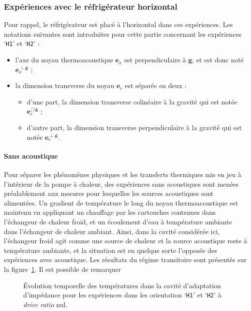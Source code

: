 \subsubsection{Expériences avec le réfrigérateur horizontal}
Pour rappel, le réfrigérateur est placé à l'horizontal dans ces expériences. Les notations suivantes sont introduites pour cette partie concernant les expériences `\texttt{H1}' et `\texttt{H2}' :

\begin{itemize}
\item l'axe du noyau thermoacoustique $\mathbf e_x$ est perpendiculaire à $\mathbf g$, et est donc noté $\mathbf e_x^{\perp \mathbf g}$ ;
\item la dimension transverse du noyau $\mathbf e_r$ est séparée en deux :
	\begin{itemize}
	\item d'une part, la dimension transverse colinéaire à la gravité qui est notée $\mathbf e_r^{// \mathbf g}$ ;
	\item d'autre part, la dimension transverse perpendiculaire à la gravité qui est notée $\mathbf e_r^{\perp \mathbf g}$.
	\end{itemize}
\end{itemize}

\paragraph{Sans acoustique}
Pour séparer les phénomènes physiques et les transferts thermiques mis en jeu à l'intérieur de la pompe à chaleur, des expériences sans acoustiques sont menées préalablement aux mesures pour lesquelles les sources acoustiques sont alimentées. Un gradient de température le long du noyau thermoacoustique est maintenu en appliquant un chauffage par les cartouches contenues dans l'échangeur de chaleur froid, et un écoulement d'eau à température ambiante dans l'échangeur de chaleur ambiant. Ainsi, dans la cavité considérée ici, l'échangeur froid agit comme une source de chaleur et la source acoustique reste à température ambiante, et la situation est en quelque sorte l'opposée des expériences avec acoustique. Les résultats du régime transitoire sont présentés sur la figure~\ref{fig:HeatOnly_CHXout_H1H2}. Il est possible de remarquer

\begin{figure}[!ht]
    \centering
    
    \caption{\'Evolution temporelle des températures dans la cavité d'adaptation d'impédance pour les expériences dans les orientation `\texttt{H1}' et `\texttt{H2}' à \textit{drive ratio} nul.}
    \label{fig:HeatOnly_CHXout_H1H2}
\end{figure}

